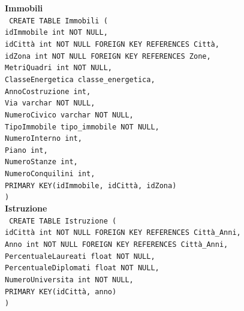\documentclass[a4paper,12pt]{report}
\begin{document}
                \noindent
                {\large \textbf{Immobili}} \\
                \texttt{
                    CREATE TABLE Immobili ( \\
                    \null\quad\quad idImmobile int NOT NULL, \\
                    \null\quad\quad idCittà int NOT NULL FOREIGN KEY REFERENCES Città, \\
                    \null\quad\quad idZona int NOT NULL FOREIGN KEY REFERENCES Zone, \\
                    \null\quad\quad MetriQuadri int NOT NULL, \\
                    \null\quad\quad ClasseEnergetica classe\_energetica, \\
                    \null\quad\quad AnnoCostruzione int, \\
                    \null\quad\quad Via varchar NOT NULL, \\
                    \null\quad\quad NumeroCivico varchar NOT NULL, \\
                    \null\quad\quad TipoImmobile tipo\_immobile NOT NULL, \\
                    \null\quad\quad NumeroInterno int, \\
                    \null\quad\quad Piano int, \\
                    \null\quad\quad NumeroStanze int, \\
                    \null\quad\quad NumeroConquilini int, \\
                    \null\quad\quad PRIMARY KEY(idImmobile, idCittà, idZona) \\
                    )
                } \\

                \noindent
                {\large \textbf{Istruzione}} \\
                \texttt{
                    CREATE TABLE Istruzione ( \\
                    \null\quad\quad idCittà int NOT NULL FOREIGN KEY REFERENCES Città\_Anni, \\
                    \null\quad\quad Anno int NOT NULL FOREIGN KEY REFERENCES Città\_Anni, \\
                    \null\quad\quad PercentualeLaureati float NOT NULL, \\
                    \null\quad\quad PercentualeDiplomati float NOT NULL, \\
                    \null\quad\quad NumeroUniversita int NOT NULL, \\
                    \null\quad\quad PRIMARY KEY(idCittà, anno) \\
                    )
                } \\
\end{document}
